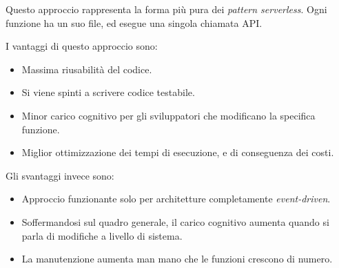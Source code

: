 Questo approccio rappresenta la forma più pura dei \textit{pattern serverless}. Ogni funzione ha un suo file, ed esegue una singola chiamata API.

I vantaggi di questo approccio sono:
\begin{itemize}
    \item Massima riusabilità del codice.
    \item Si viene spinti a scrivere codice testabile.
    \item Minor carico cognitivo per gli sviluppatori che modificano la specifica funzione.
    \item Miglior ottimizzazione dei tempi di esecuzione, e di conseguenza dei costi.
\end{itemize}

Gli svantaggi invece sono:
\begin{itemize}
    \item Approccio funzionante solo per architetture completamente \textit{event-driven}.
    \item Soffermandosi sul quadro generale, il carico cognitivo aumenta quando si parla di modifiche a livello di sistema.
    \item La manutenzione aumenta man mano che le funzioni crescono di numero.
\end{itemize}